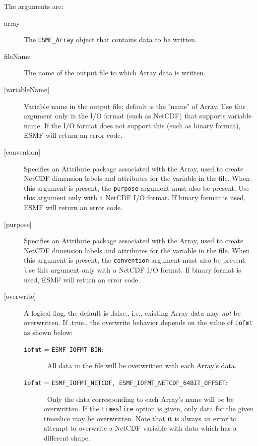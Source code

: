     The arguments are:
    \begin{description}
     \item[array]
      The {\tt ESMF\_Array} object that contains data to be written.
     \item[fileName]
      The name of the output file to which Array data is written.
     \item[{[variableName]}]
      Variable name in the output file; default is the "name" of Array.
      Use this argument only in the I/O format (such as NetCDF) that
      supports variable name. If the I/O format does not support this
      (such as binary format), ESMF will return an error code.
     \item[{[convention]}]
       Specifies an Attribute package associated with the Array, used to create NetCDF
       dimension labels and attributes for the variable in the file.  When this argument is present,
       the {\tt purpose} argument must also be present.  Use this argument only with a NetCDF
       I/O format. If binary format is used, ESMF will return an error code.
     \item[{[purpose]}]
       Specifies an Attribute package associated with the Array, used to create NetCDF
       dimension labels and attributes for the variable in the file.  When this argument is present,
       the {\tt convention} argument must also be present.  Use this argument only with a NetCDF
       I/O format. If binary format is used, ESMF will return an error code.
     \item[{[overwrite]}]
      \begin{sloppypar}
        A logical flag, the default is .false., i.e., existing Array data may
        {\em not} be overwritten. If .true., the overwrite behavior depends
        on the value of {\tt iofmt} as shown below:
      \begin{description}
      \item[{\tt iofmt} = {\tt ESMF\_IOFMT\_BIN}:]\ All data in the file will
        be overwritten with each Array's data.
      \item[{\tt iofmt} = {\tt ESMF\_IOFMT\_NETCDF, ESMF\_IOFMT\_NETCDF\_64BIT\_OFFSET}:]\ Only the
        data corresponding to each Array's name will be
        be overwritten. If the {\tt timeslice} option is given, only data for
        the given timeslice may be overwritten.
        Note that it is always an error to attempt to overwrite a NetCDF
        variable with data which has a different shape.
      \end{description}

\end{sloppypar}
\end{description}
